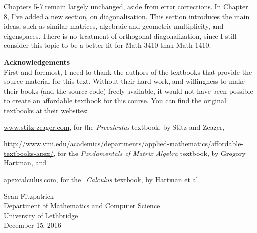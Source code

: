 Chapters 5-7 remain largely unchanged, aside from error corrections. In Chapter 8, I've added a new section, on diagonalization. This section introduces the main ideas, such as similar matrices, algebraic and geometric multiplicity, and eigenspaces. There is no treatment of orthogonal diagonalization, since I still consider this topic to be a better fit for Math 3410 than Math 1410.

\bigskip

\bigskip


\noindent\textbf{\large Acknowledgements}\\

First and foremost, I need to thank the authors of the textbooks that provide the source material for this text. Without their hard work, and willingness to make their books (and the source code) freely available, it would not have been possible to create an affordable textbook for this course. You can find the original textbooks at their websites:

\bigskip


\href{http://www.stitz-zeager.com}{www.stitz-zeager.com}, for the \textit{Precalculus} textbook, by Stitz and Zeager, 

\bigskip

\href{http://www.vmi.edu/academics/departments/applied-mathematics/affordable-textbooks-apex/}{http://www.vmi.edu/academics/departments/applied-mathematics/affordable-textbooks-apex/}, for the \textit{Fundamentals of Matrix Algebra} textbook, by Gregory Hartman, and

\bigskip

\href{http://www.apexcalculus.com}{apexcalculus.com}, for the \apex\ \textit{Calculus} textbook, by Hartman et al.



\vspace{1in}

\begin{raggedright}
Sean Fitzpatrick\\
Department of Mathematics and Computer Science\\
University of Lethbridge\\
December 15, 2016
\end{raggedright}




